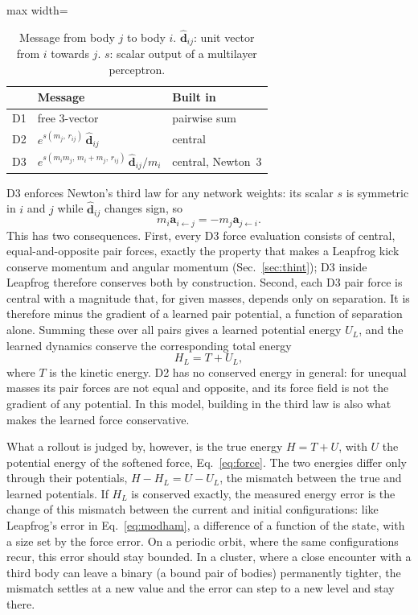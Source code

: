 \documentclass[a4paper,journal]{IEEEtran}
\newcommand{\vect}[1]{\mathbf{#1}}
\begin{document}
\begin{table}[H]
\caption{Message from body $j$ to body $i$. $\hat{\vect d}_{ij}$: unit vector from $i$ towards $j$. $s$: scalar output of a multilayer perceptron.}
\label{tab:designs}
\centering
\begin{adjustbox}{max width=\columnwidth}
\begin{tabular}{lll}
\toprule
 & Message & Built in\\
\midrule
D1 & free 3-vector & pairwise sum\\
D2 & $e^{s(m_j,\,r_{ij})}\,\hat{\vect d}_{ij}$ & central\\
D3 & $e^{s(m_im_j,\,m_i+m_j,\,r_{ij})}\,\hat{\vect d}_{ij}/m_i$ & central, Newton~3\\
\bottomrule
\end{tabular}
\end{adjustbox}
\end{table}

D3 enforces Newton's third law for any network weights: its scalar $s$ is symmetric in $i$ and $j$ while $\hat{\vect d}_{ij}$ changes sign, so
\begin{equation}
m_i\vect a_{i\leftarrow j}=-m_j\vect a_{j\leftarrow i} .
\label{eq:newton3}
\end{equation}
This has two consequences. First, every D3 force evaluation consists of central, equal-and-opposite pair forces, exactly the property that makes a Leapfrog kick conserve momentum and angular momentum (Sec.~\ref{sec:thint}); D3 inside Leapfrog therefore conserves both by construction. Second, each D3 pair force is central with a magnitude that, for given masses, depends only on separation. It is therefore minus the gradient of a learned pair potential, a function of separation alone. Summing these over all pairs gives a learned potential energy $U_L$, and the learned dynamics conserve the corresponding total energy
\begin{equation}
H_L=T+U_L ,
\label{eq:hl}
\end{equation}
where $T$ is the kinetic energy. D2 has no conserved energy in general: for unequal masses its pair forces are not equal and opposite, and its force field is not the gradient of any potential. In this model, building in the third law is also what makes the learned force conservative.

What a rollout is judged by, however, is the true energy $H=T+U$, with $U$ the potential energy of the softened force, Eq.~\eqref{eq:force}. The two energies differ only through their potentials, $H-H_L=U-U_L$, the mismatch between the true and learned potentials. If $H_L$ is conserved exactly, the measured energy error is the change of this mismatch between the current and initial configurations: like Leapfrog's error in Eq.~\eqref{eq:modham}, a difference of a function of the state, with a size set by the force error. On a periodic orbit, where the same configurations recur, this error should stay bounded. In a cluster, where a close encounter with a third body can leave a binary (a bound pair of bodies) permanently tighter, the mismatch settles at a new value and the error can step to a new level and stay there.
\end{document}
